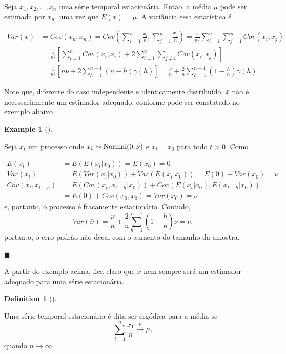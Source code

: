 \documentclass[
  letterpaper,
  DIV=11,
  numbers=noendperiod]{scrreprt}
\theoremstyle{plain}
\theoremstyle{definition}
\newtheorem{example}{Example}[chapter]
\theoremstyle{definition}
\newtheorem{definition}{Definition}[chapter]
\theoremstyle{remark}
\begin{document}
Seja \(x_1,x_2,\ldots,x_n\) uma série temporal estacionária. Então, a
média \(\mu\) pode ser estimada por \(\bar{x}_n\), uma vez que
\(E(\bar{x})=\mu\). A variância essa estatística é

\[\begin{align}Var(\bar{x})&=Cov(\bar{x}_n,\bar{x}_n)=Cov\left(\sum_{i=1}^n \frac{x_i}{n},\sum_{j=1}^n\frac{x_j}{n}\right)=\frac{1}{n^2}\sum_{i=1}^n\sum_{j=1}^nCov(x_i,x_j)\\
&=\frac{1}{n^2}\left[\sum_{i=1}^nCov(x_i,x_i)+2\sum_{i=1}^n\sum_{j\neq i}Cov(x_i,x_j)\right]\\
&=\frac{1}{n^2}\left[n\nu+2\sum_{h=1}^{n-1}(n-h)\gamma(h)\right]=\frac{\nu}{n}+\frac{2}{n}\sum_{h=1}^{n-1}\left(1-\frac{h}{n}\right)\gamma(h)
\end{align}\]

Note que, diferente do caso independente e identicamente distribuído,
\(\bar{x}\) não é necessariamente um estimador adequado, conforme pode
ser constatado no exemplo abaixo.

\begin{example}[]\protect\hypertarget{exm-estationario_nao_ergodico}{}\label{exm-estationario_nao_ergodico}

Seja \(x_t\) um processo onde \(x_0\sim\hbox{Normal}(0,\nu)\) e
\(x_t=x_0\) para todo \(t>0\). Como

\[\begin{align}
E(x_t)&=E(E(x_t|x_0))=E(x_0)=0\\
Var(x_t)&=E(Var(x_t|x_0))+Var(E(x_t|x_0))=E(0)+Var(x_0)=\nu\\
Cov(x_t,x_{t-h})&=E( Cov(x_t,x_{t-h}|x_0))+Cov( E(x_t|x_0),E(x_{t-h}|x_0))\\
&=E(0)+Cov(x_0,x_0)=Var(x_0)=\nu
\end{align}\] e, portanto, o processo é fracamente estacionário.
Contudo,
\[Var(\bar{x})=\frac{\nu}{n}+\frac{2}{n}\sum_{h=1}^{n-1}\left(1-\frac{h}{n}\right)\nu=\nu,\]
portanto, o erro padrão não decai com o aumento do tamanho da amostra.

\(\blacksquare\)

\end{example}

A partir do exemplo acima, fica claro que \(\bar{x}\) nem sempre será um
estimador adequado para uma série estacionária.

\begin{definition}[]\protect\hypertarget{def-ergodica}{}\label{def-ergodica}

Uma série temporal estacionária é dita ser ergódica para a média se
\[\sum_{i=1}^n\frac{x_1}{n}\stackrel{p}{\rightarrow} \mu,\] quando
\(n\rightarrow\infty\).

\end{definition}
\end{document}
